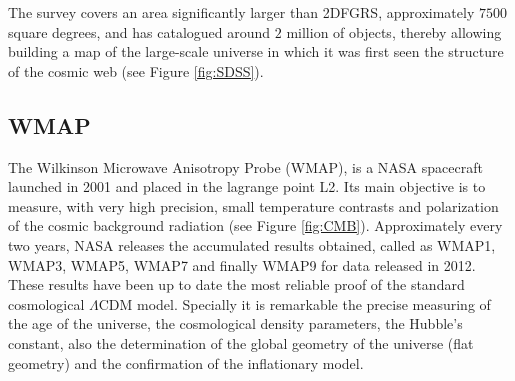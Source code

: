 The survey covers an area significantly larger than 2DFGRS, 
approximately $7500$ square degrees, and has catalogued around $2$ million
of objects, thereby allowing building a map of the large-scale universe in 
which it was first seen the structure of the cosmic web (see Figure 
\ref{fig:SDSS}).


	
	\subsection*{WMAP}
	\label{subsec:WMAP}


The Wilkinson Microwave Anisotropy Probe (WMAP), is a NASA spacecraft 
launched in 2001 and placed in the lagrange point L2. Its main objective
is to measure, with very high precision, small temperature contrasts and 
polarization of the cosmic background radiation (see Figure \ref{fig:CMB}).
Approximately every two years, NASA releases the accumulated results 
obtained, called as WMAP1, WMAP3, WMAP5, WMAP7 and finally WMAP9 for data 
released in 2012. These results have been up to date the most reliable 
proof of the standard cosmological $\Lambda$CDM model. Specially it is
remarkable the precise measuring of the age of the universe, the 
cosmological density parameters, the Hubble's constant, also the 
determination of the global geometry of the universe (flat geometry) and
the confirmation of the inflationary model.


